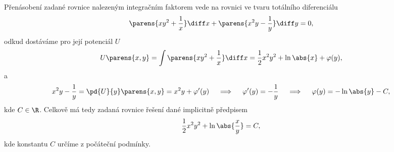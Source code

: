 \documentclass[answers]{exam}
\begin{document}
\begin{questions}
\begin{solution}
		Přenásobení zadané rovnice nalezeným integračním faktorem vede na rovnici ve tvaru totálního diferenciálu
		\begin{equation*}
			\parens{xy^2 + \frac{1}{x}} \diff x + \parens{x^2y-\frac{1}{y}} \diff y = 0,
		\end{equation*}
		odkud dostáváme pro její potenciál $U$
		\begin{equation*}
			U\parens{x,y}
			=
			\int
				\parens{xy^2 + \frac{1}{x}}
			\diff x
			=
			\frac{1}{2}x^2y^2 + \ln \abs{x} + \varphi(y),
		\end{equation*}
		a
		\begin{equation*}
			x^2y - \frac{1}{y}
			=
			\pd{U}{y}\parens{x,y}
			=
			x^2 y + \varphi'(y)
			\quad
			\implies
			\quad
			\varphi'(y) = - \frac{1}{y}
			\quad
			\implies
			\quad
			\varphi(y) = - \ln \abs{y} - C,
		\end{equation*}
		kde $C \in \R$. Celkově má tedy zadaná rovnice řešení dané implicitně předpisem
		\begin{equation*}
			\frac{1}{2} x^2 y^2 + \ln \abs{\frac{x}{y}} = C,
		\end{equation*}
		kde konstantu $C$ určíme z počáteční podmínky.
	\end{solution}
  
\end{questions}
\end{document}
